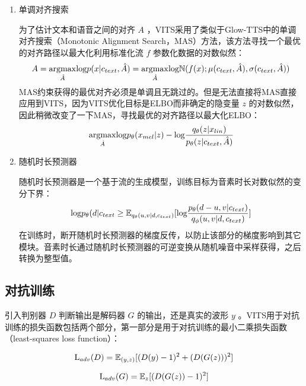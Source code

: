 \documentclass[cn,10pt,math=newtx,citestyle=gb7714-2015,bibstyle=gb7714-2015]{elegantbook}
\begin{document}
\begin{enumerate}
  \item 单调对齐搜索
  
  为了估计文本和语音之间的对齐 $A$ ，VITS采用了类似于Glow-TTS中的单调对齐搜索（Monotonic Alignment Search，MAS）方法，该方法寻找一个最优的对齐路径以最大化利用标准化流 $f$ 参数化数据的对数似然：
  \begin{equation}
    A=\underset{\hat{A}}{\rm argmax}{\rm log}p(x|c_{text},\hat{A})=\underset{\hat{A}}{\rm argmax}{\rm log}\mathbb{N}(f(x);\mu(c_{text},\hat{A}),\sigma(c_{text},\hat{A}))
  \end{equation}
  MAS约束获得的最优对齐必须是单调且无跳过的。但是无法直接将MAS直接应用到VITS，因为VITS优化目标是ELBO而非确定的隐变量 $z$ 的对数似然，因此稍微改变了一下MAS，寻找最优的对齐路径以最大化ELBO：
  \begin{equation}
    \underset{\hat{A}}{\rm argmax}{\rm log}p_\theta (x_{mel}|z)-{\rm log}\frac{q_\theta(z|x_{lin})}{p_\theta (z|c_{text},\hat{A})}
  \end{equation}

  \item 随机时长预测器
  
  随机时长预测器是一个基于流的生成模型，训练目标为音素时长对数似然的变分下界：
  \begin{equation}
    {\rm log}p_\theta (d|c_{text}\geq \mathbb{E}_{q_\theta (u,v|d,c_{text})}[{\rm log}\frac{p_\theta (d-u,v|c_{text})}{q_\phi (u,v|d,c_{text})}]
  \end{equation}
  在训练时，断开随机时长预测器的梯度反传，以防止该部分的梯度影响到其它模块。音素时长通过随机时长预测器的可逆变换从随机噪音中采样获得，之后转换为整型值。

\end{enumerate}

\subsection{对抗训练}

引入判别器 $D$ 判断输出是解码器 $G$ 的输出，还是真实的波形 $y$ 。VITS用于对抗训练的损失函数包括两个部分，第一部分是用于对抗训练的最小二乘损失函数（least-squares loss function）： 

\begin{equation}
  {\rm L}_{adv}(D)=\mathbb{E}_{(y,z)}[(D(y)-1)^2+(D(G(z)))^2]
\end{equation}

\begin{equation}
  {\rm L}_{adv}(G)=\mathbb{E}_z[(D(G(z))-1)^2]
\end{equation}
\end{document}
